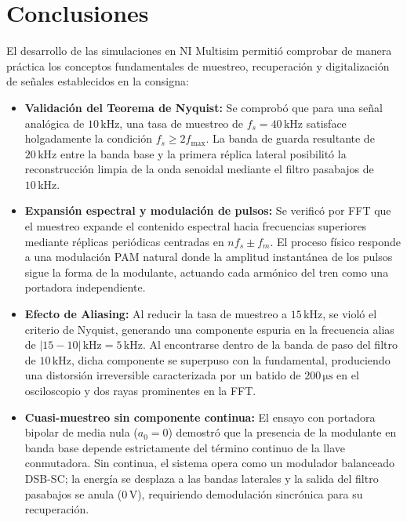 \chapter{Conclusiones}
\label{sec.ej4:conclusiones}

El desarrollo de las simulaciones en NI Multisim permitió comprobar de manera práctica los conceptos fundamentales
de muestreo, recuperación y digitalización de señales establecidos en la consigna:

\begin{itemize}
    \item \textbf{Validación del Teorema de Nyquist:} Se comprobó que para una señal analógica de $10\,\unit{\kilo\hertz}$,
          una tasa de muestreo de $f_s = 40\,\unit{\kilo\hertz}$ satisface holgadamente la condición $f_s \ge 2 f_{\max}$.
          La banda de guarda resultante de $20\,\unit{\kilo\hertz}$ entre la banda base y la primera réplica lateral
          posibilitó la reconstrucción limpia de la onda senoidal mediante el filtro pasabajos de $10\,\unit{\kilo\hertz}$.

    \item \textbf{Expansión espectral y modulación de pulsos:} Se verificó por FFT que el muestreo expande el contenido
          espectral hacia frecuencias superiores mediante réplicas periódicas centradas en $n f_s \pm f_m$. El proceso
          físico responde a una modulación PAM natural donde la amplitud instantánea de los pulsos sigue la forma de la
          modulante, actuando cada armónico del tren como una portadora independiente.

    \item \textbf{Efecto de Aliasing:} Al reducir la tasa de muestreo a $15\,\unit{\kilo\hertz}$, se violó el criterio
          de Nyquist, generando una componente espuria en la frecuencia alias de $|15 - 10|\,\unit{\kilo\hertz} = 5\,\unit{\kilo\hertz}$.
          Al encontrarse dentro de la banda de paso del filtro de $10\,\unit{\kilo\hertz}$, dicha componente se superpuso
          con la fundamental, produciendo una distorsión irreversible caracterizada por un batido de $200\,\unit{\micro\second}$
          en el osciloscopio y dos rayas prominentes en la FFT.

    \item \textbf{Cuasi-muestreo sin componente continua:} El ensayo con portadora bipolar de media nula ($a_0 = 0$)
          demostró que la presencia de la modulante en banda base depende estrictamente del término continuo de la llave
          conmutadora. Sin continua, el sistema opera como un modulador balanceado DSB-SC; la energía se desplaza a las
          bandas laterales y la salida del filtro pasabajos se anula ($0\,\unit{\volt}$), requiriendo demodulación
          sincrónica para su recuperación.


\end{itemize}
